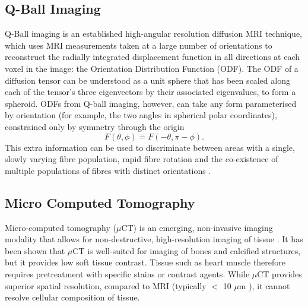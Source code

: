   \subsection{Q-Ball Imaging} %
  \label{sub:q_ball_imaging}
    Q-Ball imaging is an established high-angular resolution diffusion MRI technique, which uses MRI measurements taken at a large number of orientations to reconstruct the radially integrated displacement function in all directions at each voxel in the image: the Orientation Distribution Function (ODF). The ODF of a diffusion tensor can be understood as a unit sphere that has been scaled along each of the tensor's three eigenvectors by their associated eigenvalues, to form a spheroid. ODFs from Q-ball imaging, however, can take any form parameterised by orientation (for example, the two angles in spherical polar coordinates), constrained only by symmetry through the origin
    \begin{equation}
      F(\theta, \phi) = F(-\theta, \pi - \phi).
    \end{equation}
    This extra information can be used to discriminate between areas with a single, slowly varying fibre population, rapid fibre rotation and the co-existence of multiple populations of fibres with distinct orientations \cite{Dierckx2009}.
  
  
  \subsection{Micro Computed Tomography} %
  \label{sub:micro_computed_tomography}
    Micro-computed tomography ($\mu$CT) is an emerging, non-invasive imaging modality that allows for non-destructive, high-resolution imaging of tissue \cite{Ragan2007,Deng2012}. It has been shown that $\mu$CT is well-suited for imaging of bones and calcified structures, but it provides low soft tissue contrast. Tissue such as heart muscle therefore requires pretreatment with specific stains or contrast agents. While $\mu$CT provides superior spatial resolution, compared to MRI (typically $<$ 10 $\mu$m \cite{Metscher2009,Stephenson2012}), it cannot resolve cellular composition of tissue.
  
